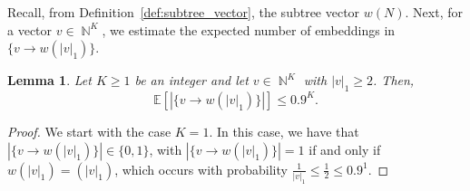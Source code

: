 \documentclass[11pt]{article}
\numberwithin{equation}{section}
\DeclareMathOperator{\N}{\mathbb{N}} %
\newcommand{\E}{\mathbb{E}} %
\newcommand{\be}{\begin{equation}}
\newcommand{\ee}{\end{equation}}
\newtheorem{lemma}[theorem]{Lemma}
\theoremstyle{definition}
\begin{document}
Recall, from Definition~\ref{def:subtree_vector}, the subtree vector $w(N).$ Next, for a vector $v\in \N^K$, we estimate the expected number of embeddings in $\{v\rightarrow w(|v|_1)\}$.

\begin{lemma}\label{lemma:pdembed}
    Let $K\geq 1$ be an integer and let $v\in \N^K$ with $|v|_1 \geq 2$. Then,
    \be 
    \E[|\{v\rightarrow w(|v|_1)\}|]\leq 0.9^{K}.
    \ee 
\end{lemma}

\begin{proof} 
We start with the case $K=1$. In this case, we have that $|\{v\rightarrow w(|v|_1)\}| \in \{0,1\}$, with $|\{v\rightarrow w(|v|_1)\}| = 1$ if and only if $w(|v|_1) = (|v|_1)$, which occurs with probability $\frac{1}{|v|_1} \leq \frac{1}{2} \leq 0.9^1$.


\end{proof}
\end{document}
